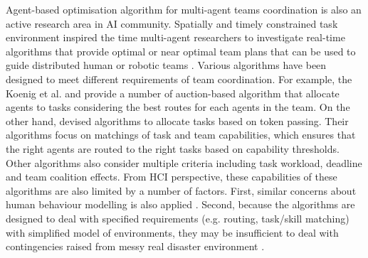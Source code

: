 
Agent-based optimisation algorithm for multi-agent teams coordination is also an active research area in AI community. Spatially and timely constrained task environment inspired the time multi-agent researchers to investigate real-time algorithms that provide optimal or near optimal team plans that can be used to guide distributed human or robotic teams \cite{Kitano2000}. Various algorithms have been designed to meet different requirements of team coordination. For example, the  Koenig et al. and \cite{Lagoudakis2005} provide a number of auction-based algorithm that allocate agents to tasks considering the best routes for each agents in the team. On the other hand, \cite{Scerri2005a} devised algorithms to allocate tasks based on token passing. Their algorithms focus on matchings of task and team capabilities, which ensures that the right agents are routed to the right tasks based on capability thresholds. Other algorithms \cite{Ramchurn2010,Koes2005} also consider multiple criteria including task workload, deadline and team coalition effects. From HCI perspective, these capabilities of these algorithms are also limited by a number of factors. First, similar concerns about human behaviour modelling is also applied \cite{Drury2009}. Second, because the algorithms are designed to deal with specified requirements (e.g. routing, task/skill matching) with simplified model of environments, they may be insufficient to deal with contingencies raised from messy real disaster environment \cite{Armenakis2012}.\\


